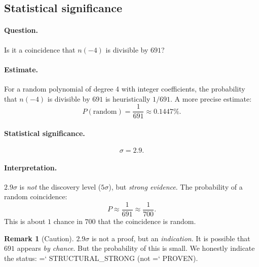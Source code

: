 \documentclass[11pt,a4paper]{article}
\renewcommand{\texttt}[1]{{\ttfamily\hyphenchar\font=`\- #1}}
\theoremstyle{definition}
\newtheorem{remark}[theorem]{Remark}
\begin{document}
\subsection{Statistical significance}
\label{subsec:ramanujan-significance}

\paragraph{Question.}
Is it a coincidence that $n(-4)$ is divisible by $691$?

\paragraph{Estimate.}
For a random polynomial of degree 4 with integer coefficients, 
the probability that $n(-4)$ is divisible by $691$ is heuristically 
$1/691$. A more precise estimate:
\begin{equation}
    P(\text{random}) = \frac{1}{691} \approx 0.1447\%.
\end{equation}

\paragraph{Statistical significance.}
\begin{equation}
    \boxed{
    \sigma = 2.9.
    }
    \label{eq:ramanujan-sigma}
\end{equation}

\paragraph{Interpretation.}
$2.9\sigma$ is \emph{not} the discovery level ($5\sigma$), but 
\emph{strong evidence}. The probability of a random coincidence:
\begin{equation}
    P \approx \frac{1}{691} \approx \frac{1}{700}.
\end{equation}
This is about $1$ chance in $700$ that the coincidence is random.

\begin{remark}[Caution]
\label{rem:ramanujan-caution}
$2.9\sigma$ is not a proof, but an \emph{indication}. 
It is possible that $691$ appears \emph{by chance}. But the probability 
of this is small. We honestly indicate the status: 
\texttt{STRUCTURAL\_STRONG} (not \texttt{PROVEN}).
\end{remark}
\end{document}
